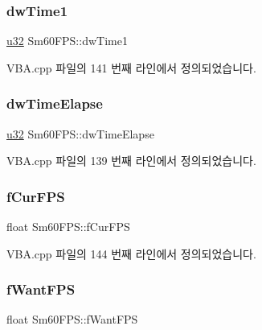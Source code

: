\subsubsection{\texorpdfstring{dw\+Time1}{dwTime1}}
{\footnotesize\ttfamily \mbox{\hyperlink{_system_8h_a10e94b422ef0c20dcdec20d31a1f5049}{u32}} Sm60\+F\+P\+S\+::dw\+Time1}



V\+B\+A.\+cpp 파일의 141 번째 라인에서 정의되었습니다.

\mbox{\label{namespace_sm60_f_p_s_a8456d33b653d1463e8dff058f592d96a}} 
\subsubsection{\texorpdfstring{dw\+Time\+Elapse}{dwTimeElapse}}
{\footnotesize\ttfamily \mbox{\hyperlink{_system_8h_a10e94b422ef0c20dcdec20d31a1f5049}{u32}} Sm60\+F\+P\+S\+::dw\+Time\+Elapse}



V\+B\+A.\+cpp 파일의 139 번째 라인에서 정의되었습니다.

\mbox{\label{namespace_sm60_f_p_s_aee0246375d7c962cc9bca89f54df61a5}} 
\subsubsection{\texorpdfstring{f\+Cur\+F\+PS}{fCurFPS}}
{\footnotesize\ttfamily float Sm60\+F\+P\+S\+::f\+Cur\+F\+PS}



V\+B\+A.\+cpp 파일의 144 번째 라인에서 정의되었습니다.

\mbox{\label{namespace_sm60_f_p_s_add2b9096a788d1dc088810430f7d30bf}} 
\subsubsection{\texorpdfstring{f\+Want\+F\+PS}{fWantFPS}}
{\footnotesize\ttfamily float Sm60\+F\+P\+S\+::f\+Want\+F\+PS}




